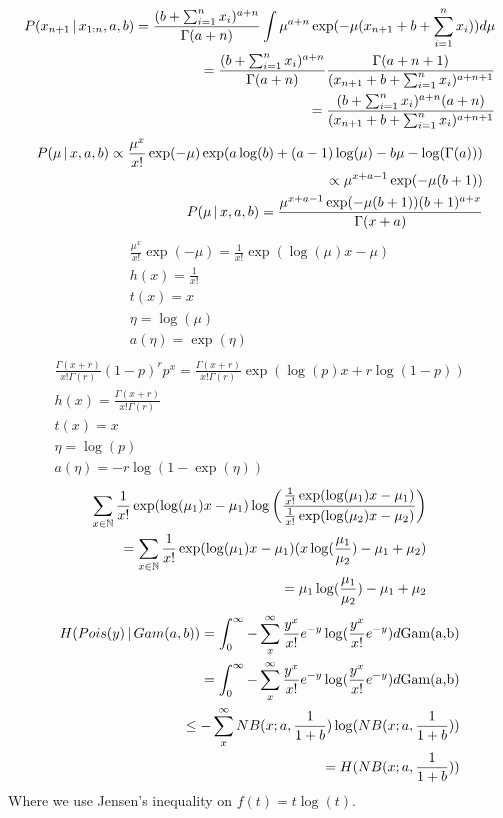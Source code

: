 \documentclass[hidequestions]{homework}
\begin{document}
\subproblem 
\begin{align*}
    P(x_{n+1} \,\vert\, x_{1:n}, a, b) = \frac{(b + \sum_{i=1}^n x_i)^{a+n}}{\Gamma(a+n)} \int \mu^{a+n} \exp(-\mu(x_{n+1} + b + \sum_{i=1}^n x_i))d\mu\\
    = \frac{(b + \sum_{i=1}^n x_i)^{a+n}}{\Gamma(a+n)} \frac{\Gamma(a+n+1)}{(x_{n+1} + b + \sum_{i=1}^n x_i)^{a+n+1}}\\
    = \frac{(b + \sum_{i=1}^n x_i)^{a+n} (a+n)}{(x_{n+1} + b + \sum_{i=1}^n x_i)^{a+n+1}}
\end{align*}
\problem 
\subproblem 
\begin{align*}
    P(\mu \,\vert\, x,a,b) \propto \frac{\mu^x}{x!}\exp(-\mu)\exp(a\log(b) + (a-1)\log(\mu) - b\mu - \log(\Gamma(a)))\\
    \propto \mu^{x + a -1} \exp(-\mu(b + 1))\\
    P(\mu \,\vert\, x,a,b) = \frac{\mu^{x + a -1} \exp(-\mu(b + 1))(b+1)^{a+x}}{\Gamma(x + a)}
\end{align*}
\subproblem
\begin{align*}
    \frac{\mu^x}{x!}\exp(-\mu) = \frac{1}{x!}\exp(\log(\mu)x - \mu)\\
    h(x) = \frac{1}{x!}\\
    t(x) = x\\
    \eta = \log(\mu)\\
    a(\eta) = \exp(\eta)\\
\end{align*}
\begin{align*}
    \frac{\Gamma(x + r)}{x! \Gamma(r)}(1-p)^r p^x = \frac{\Gamma(x + r)}{x! \Gamma(r)}\exp(\log(p)x + r\log(1-p))\\
    h(x) = \frac{\Gamma(x + r)}{x! \Gamma(r)}\\
    t(x) = x\\
    \eta = \log(p)\\
    a(\eta) = -r\log(1-\exp(\eta))
\end{align*}
\subproblem
\begin{align*}
    \sum_{x \in \mathbb N} \frac{1}{x!}\exp(\log(\mu_1)x - \mu_1) \log\left(\frac{\frac{1}{x!}\exp(\log(\mu_1)x - \mu_1)}{\frac{1}{x!}\exp(\log(\mu_2)x - \mu_2)}\right)\\
    =\sum_{x \in \mathbb N} \frac{1}{x!}\exp(\log(\mu_1)x - \mu_1)(x\log(\frac{\mu_1}{\mu_2}) - \mu_1 + \mu_2)\\
    = \mu_1\log(\frac{\mu_1}{\mu_2}) - \mu_1 + \mu_2\\
\end{align*}
\subproblem
\begin{align*}
H(Pois(y) \,\vert\, Gam(a,b))
    =\int_{0}^{\infty} -\sum_{x}^{\infty} \frac{y^x}{x!}e^{-y}\log(\frac{y^x}{x!}e^{-y})  d\text{Gam(a,b)}\\
    =\int_{0}^{\infty} -\sum_{x}^{\infty} \frac{y^x}{x!}e^{-y}\log(\frac{y^x}{x!}e^{-y})  d\text{Gam(a,b)}\\
    \leq  -\sum_{x}^{\infty} NB(x; a, \frac{1}{1+b}) \log(NB(x; a, \frac{1}{1+b}))\\
    = H(NB(x; a, \frac{1}{1+b}))
\end{align*}
Where we use Jensen's inequality on $f(t) = t\log(t)$.
\end{document}

